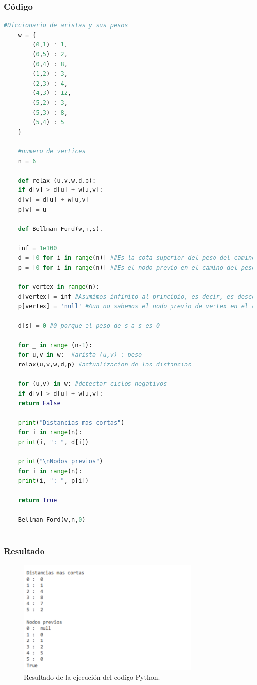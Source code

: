 \subsubsection{Código}
\begin{lstlisting}[language=Python]
	#Diccionario de aristas y sus pesos
	w = {
		(0,1) : 1,
		(0,5) : 2,
		(0,4) : 8,
		(1,2) : 3,
		(2,3) : 4,
		(4,3) : 12,
		(5,2) : 3,
		(5,3) : 8,
		(5,4) : 5
	}
	
	#numero de vertices
	n = 6
	
	def relax (u,v,w,d,p):
	if d[v] > d[u] + w[u,v]:
	d[v] = d[u] + w[u,v]
	p[v] = u
	
	def Bellman_Ford(w,n,s):
	
	inf = 1e100
	d = [0 for i in range(n)] ##Es la cota superior del peso del camino mas corto de s a v, se inicializa en infinito
	p = [0 for i in range(n)] ##Es el nodo previo en el camino del peso mas corto de s a v
	
	for vertex in range(n):
	d[vertex] = inf #Asumimos infinito al principio, es decir, es desconocido el limite
	p[vertex] = 'null' #Aun no sabemos el nodo previo de vertex en el camino mas corto
	
	d[s] = 0 #0 porque el peso de s a s es 0
	
	for _ in range (n-1):
	for u,v in w:  #arista (u,v) : peso
	relax(u,v,w,d,p) #actualizacion de las distancias
	
	for (u,v) in w: #detectar ciclos negativos
	if d[v] > d[u] + w[u,v]:
	return False
	
	print("Distancias mas cortas")
	for i in range(n):
	print(i, ": ", d[i])
	
	print("\nNodos previos")
	for i in range(n):
	print(i, ": ", p[i])
	
	return True
	
	Bellman_Ford(w,n,0)
	
\end{lstlisting}

\subsubsection{Resultado}
\begin{figure}[H]
	\centering
	\includegraphics[width=0.8\textwidth]{resultado_distancias_ejem2.png}
	\caption{Resultado de la ejecución del codigo Python.}
	\label{fig:resultado6}
\end{figure}

